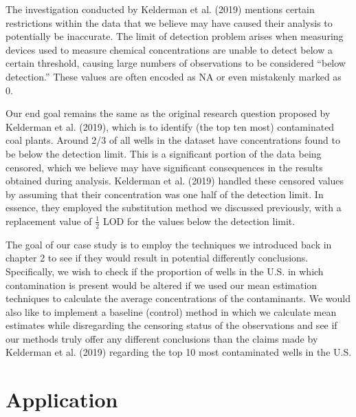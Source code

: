 \documentclass[12pt, twoside]{amherstthesis}
\begin{document}
The investigation conducted by Kelderman et al. (2019) mentions certain restrictions within the data that we believe may have caused their analysis to potentially be inaccurate. The limit of detection problem arises when measuring devices used to measure chemical concentrations are unable to detect below a certain threshold, causing large numbers of observations to be considered ``below detection.'' These values are often encoded as NA or even mistakenly marked as 0.

Our end goal remains the same as the original research question proposed by Kelderman et al. (2019), which is to identify (the top ten most) contaminated coal plants. Around 2/3 of all wells in the dataset have concentrations found to be below the detection limit. This is a significant portion of the data being censored, which we believe may have significant consequences in the results obtained during analysis. Kelderman et al. (2019) handled these censored values by assuming that their concentration was one half of the detection limit. In essence, they employed the substitution method we discussed previously, with a replacement value of \(\frac{1}{2}\) LOD for the values below the detection limit.

The goal of our case study is to employ the techniques we introduced back in chapter 2 to see if they would result in potential differently conclusions. Specifically, we wish to check if the proportion of wells in the U.S. in which contamination is present would be altered if we used our mean estimation techniques to calculate the average concentrations of the contaminants. We would also like to implement a baseline (control) method in which we calculate mean estimates while disregarding the censoring status of the observations and see if our methods truly offer any different conclusions than the claims made by Kelderman et al. (2019) regarding the top 10 most contaminated wells in the U.S.

\hypertarget{application}{%
\section{Application}\label{application}}
\end{document}
